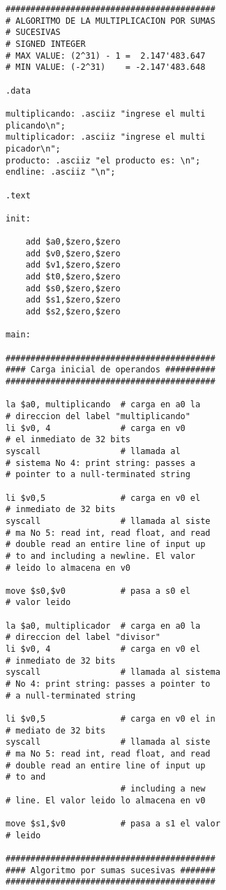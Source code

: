\documentclass[twocolumn]{IEEEtran}
\begin{document}
\lstset{numbers=left, numberstyle=\tiny, stepnumber=1, numbersep=1pt}
\begin{lstlisting}[firstnumber=7, caption=Codigo inicial, label=code1]
##########################################
# ALGORITMO DE LA MULTIPLICACION POR SUMAS
# SUCESIVAS
# SIGNED INTEGER
# MAX VALUE: (2^31) - 1 =  2.147'483.647
# MIN VALUE: (-2^31)    = -2.147'483.648

.data

multiplicando: .asciiz "ingrese el multi
plicando\n";
multiplicador: .asciiz "ingrese el multi
picador\n";
producto: .asciiz "el producto es: \n";
endline: .asciiz "\n";

.text

init:

	add $a0,$zero,$zero
	add $v0,$zero,$zero
	add $v1,$zero,$zero
	add $t0,$zero,$zero
	add $s0,$zero,$zero
	add $s1,$zero,$zero
	add $s2,$zero,$zero

main:

##########################################
#### Carga inicial de operandos ##########
##########################################

la $a0, multiplicando  # carga en a0 la 
# direccion del label "multiplicando"
li $v0, 4              # carga en v0 
# el inmediato de 32 bits
syscall                # llamada al 
# sistema No 4: print string: passes a 
# pointer to a null-terminated string 

li $v0,5               # carga en v0 el 
# inmediato de 32 bits
syscall                # llamada al siste
# ma No 5: read int, read float, and read 
# double read an entire line of input up 
# to and including a newline. El valor
# leido lo almacena en v0

move $s0,$v0           # pasa a s0 el 
# valor leido

la $a0, multiplicador  # carga en a0 la 
# direccion del label "divisor"
li $v0, 4              # carga en v0 el 
# inmediato de 32 bits
syscall                # llamada al sistema
# No 4: print string: passes a pointer to 
# a null-terminated string 

li $v0,5               # carga en v0 el in
# mediato de 32 bits
syscall                # llamada al siste
# ma No 5: read int, read float, and read
# double read an entire line of input up 
# to and 
                       # including a new
# line. El valor leido lo almacena en v0

move $s1,$v0           # pasa a s1 el valor
# leido

##########################################
#### Algoritmo por sumas sucesivas #######
##########################################


\end{lstlisting}
\end{document}
